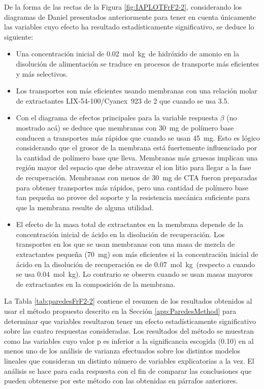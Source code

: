 De la forma de las rectas de la Figura \ref{fig:IAPLOTFrF2-2}, considerando los diagramas de Daniel presentados anteriormente para tener en cuenta únicamente las variables cuyo efecto ha resultado estadísticamente significativo, se deduce lo siguiente:
\begin{itemize}
    \item Una concentración inicial de 0.02~mol~kg\mnn\ de hidróxido de amonio en la disolución de alimentación se traduce en procesos de transporte más eficientes y más selectivos.
    \item Los transportes son más eficientes usando membranas con una relación molar de extractantes LIX-54-100/Cyanex~923 de 2 que cuando se usa 3.5.
    \item Con el diagrama de efectos principales para la variable respuesta $\beta$ (no mostrado acá) se deduce que membranas con 30~mg de polímero base conducen a transportes más rápidos que cuando se usan 45~mg. Esto es lógico considerando que el grosor de la membrana está fuertemente influenciado por la cantidad de polímero base que lleva. Membranas más gruesas implican una región mayor del espacio que debe atravezar el ion litio para llegar a la fase de recuperación. Membranas con menos de 30~mg de CTA fueron preparadas para obtener transportes más rápidos, pero una cantidad de polímero base tan pequeña no provee del soporte y la resistencia mecánica suficiente para que la membrana resulte de alguna utilidad.
    \item El efecto de la masa total de extractantes en la membrana depende de la concentración inicial de ácido en la disolución de recuperación. Los transportes en los que se usan membranas con una masa de mezcla de extractantes pequeña (70~mg) son más eficientes si la concentración inicial de ácido en la disolución de recuperación es de 0.07~mol~kg\mnn\ (respecto a cuando se usa 0.04~mol~kg\mnn). Lo contrario se observa cuando se usan masas mayores de extractantes en la composición de la membrana.
\end{itemize}

La Tabla \ref{tab:paredesFrF2-2} contiene el resumen de los resultados obtenidos al usar el método propuesto descrito en la Sección \ref{app:ParedesMethod} para determinar que variables resultaron tener un efecto estadísticamente significativo sobre las cuatro respuestas consideradas. Los resultados del método se muestran como las variables cuyo valor p es inferior a la significancia escogida (0.10) en al menos uno de los análisis de varianza efectuados sobre los distintos modelos lineales que consideran un distinto número de variables explicatorias a la vez. El análisis se hace para cada respuesta con el fin de comparar las conclusiones que pueden obtenerse por este método con las obtenidas en párrafos anteriores.

